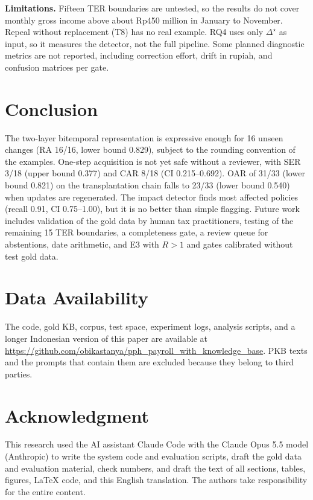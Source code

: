 \documentclass[conference]{IEEEtran}
\newcommand{\gold}{\star}
\begin{document}
\textbf{Limitations.} Fifteen TER boundaries are untested, so the results do not cover monthly gross income above about Rp450 million in January to November. Repeal without replacement (T8) has no real example. RQ4 uses only $\Delta^{\gold}$ as input, so it measures the detector, not the full pipeline. Some planned diagnostic metrics are not reported, including correction effort, drift in rupiah, and confusion matrices per gate.

\section{Conclusion}
\label{sec:kesimpulan}
The two-layer bitemporal representation is expressive enough for 16 unseen changes (RA 16/16, lower bound 0.829), subject to the rounding convention of the examples. One-step acquisition is not yet safe without a reviewer, with SER 3/18 (upper bound 0.377) and CAR 8/18 (CI 0.215--0.692). OAR of 31/33 (lower bound 0.821) on the transplantation chain falls to 23/33 (lower bound 0.540) when updates are regenerated. The impact detector finds most affected policies (recall 0.91, CI 0.75--1.00), but it is no better than simple flagging. Future work includes validation of the gold data by human tax practitioners, testing of the remaining 15 TER boundaries, a completeness gate, a review queue for abstentions, date arithmetic, and E3 with $R > 1$ and gates calibrated without test gold data.

\section*{Data Availability}
The code, gold KB, corpus, test space, experiment logs, analysis scripts, and a longer Indonesian version of this paper are available at \url{https://github.com/obikastanya/pph_payroll_with_knowledge_base}. PKB texts and the prompts that contain them are excluded because they belong to third parties.

\section*{Acknowledgment}
This research used the AI assistant Claude Code with the Claude Opus 5.5 model (Anthropic) to write the system code and evaluation scripts, draft the gold data and evaluation material, check numbers, and draft the text of all sections, tables, figures, \LaTeX{} code, and this English translation. The authors take responsibility for the entire content.



\end{document}
